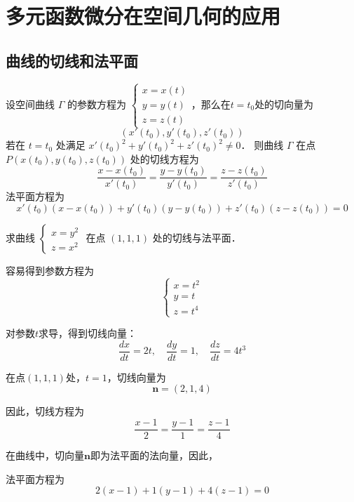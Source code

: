 \documentclass[12pt, a4paper, oneside, UTF8]{ctexbook}
\begin{document}
\section{多元函数微分在空间几何的应用}
\subsection{曲线的切线和法平面}
\begin{theorem}
    设空间曲线 $\Gamma$ 的参数方程为 $\begin{cases} x = x(t) \\ y = y(t) \\ z = z(t) \end{cases}$，那么在$t=t_0$处的切向量为
    \[\left( x'(t_0), y'(t_0), z'(t_0) \right)\]
    若在 $t=t_0$ 处满足 $x'(t_0)^2 + y'(t_0)^2 + z'(t_0)^2 \ne 0$．
    则曲线 $\Gamma$ 在点 $P(x(t_0), y(t_0), z(t_0))$ 处的切线方程为
    \[
        \frac{x - x(t_0)}{x'(t_0)} = \frac{y - y(t_0)}{y'(t_0)} = \frac{z - z(t_0)}{z'(t_0)}
    \]
    法平面方程为
    \[
        x'(t_0)(x - x(t_0)) + y'(t_0)(y - y(t_0)) + z'(t_0)(z - z(t_0)) = 0
    \]
\end{theorem}

\begin{example}
    求曲线 $\begin{cases}
        x = y^2\\
        z = x^2
    \end{cases}$ 在点 $(1,1,1)$ 处的切线与法平面．
\end{example}
\begin{solution}
    容易得到参数方程为
    \[ \begin{cases} x=t^2 \\ y=t \\ z=t^4 \end{cases} \]

    对参数$t$求导，得到切线向量：
    \[ \frac{dx}{dt} = 2t, \quad \frac{dy}{dt} = 1, \quad \frac{dz}{dt} = 4t^3 \]
    
    在点$(1,1,1)$处，$t=1$，切线向量为
    \[ \bm{n} = (2, 1, 4) \]
    
    因此，切线方程为
    \[ \boxed{\frac{x-1}{2} = \frac{y-1}{1} = \frac{z-1}{4}} \]
    
    在曲线中，切向量$\bm{n}$即为法平面的法向量，因此，

    法平面方程为
    \[ \boxed{2(x-1) + 1(y-1) + 4(z-1) = 0} \]
    
\end{solution}
\end{document}
